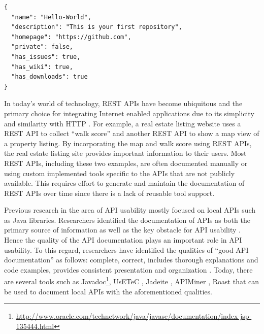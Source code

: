 \begin{verbatim}
{
  "name": "Hello-World",
  "description": "This is your first repository",
  "homepage": "https://github.com",
  "private": false,
  "has_issues": true,
  "has_wiki": true,
  "has_downloads": true
}
\end{verbatim}

In today's world of technology, REST APIs have become ubiquitous and the primary choice for integrating Internet enabled applications due to its simplicity and similarity with HTTP \cite{mangler2010origin}. For example, a real estate listing website uses a REST API to collect ``walk score'' and another REST API to show a map view of a property listing. By incorporating the map and walk score using REST APIs, the real estate listing site provides important information to their users. Most REST APIs, including these two examples, are often documented manually or using custom implemented tools specific to the APIs that are not publicly available. This requires effort to generate and maintain the documentation of REST APIs over time since there is a lack of reusable tool support.

Previous research in the area of API usability mostly focused on local APIs such as Java libraries. Researchers identified the documentation of APIs as both the primary source of information as well as the key obstacle for API usability \cite{Robillard_what_makes}. Hence the quality of the API documentation plays an important role in API usability. To this regard, researchers have identified the qualities of ``good API documentation'' as follows: complete, correct, includes thorough explanations and code examples, provides consistent presentation and organization \cite{Robillard_what_makes,Myers_study}. Today, there are several tools such as Javadoc\footnote{\url{http://www.oracle.com/technetwork/java/javase/documentation/index-jsp-135444.html}}, UsETeC \cite{zhu2014mining}, Jadeite \cite{Jadeite}, APIMiner \cite{montandon2013documenting}, Roast \cite{Hoffman_api_documentation} that can be used to document local APIs with the aforementioned qualities.

